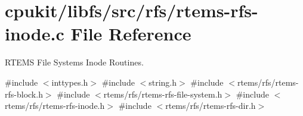\hypertarget{rtems-rfs-inode_8c}{}\section{cpukit/libfs/src/rfs/rtems-\/rfs-\/inode.c File Reference}
\label{rtems-rfs-inode_8c}


R\+T\+E\+MS File Systems Inode Routines.  


{\ttfamily \#include $<$inttypes.\+h$>$}\newline
{\ttfamily \#include $<$string.\+h$>$}\newline
{\ttfamily \#include $<$rtems/rfs/rtems-\/rfs-\/block.\+h$>$}\newline
{\ttfamily \#include $<$rtems/rfs/rtems-\/rfs-\/file-\/system.\+h$>$}\newline
{\ttfamily \#include $<$rtems/rfs/rtems-\/rfs-\/inode.\+h$>$}\newline
{\ttfamily \#include $<$rtems/rfs/rtems-\/rfs-\/dir.\+h$>$}\newline
